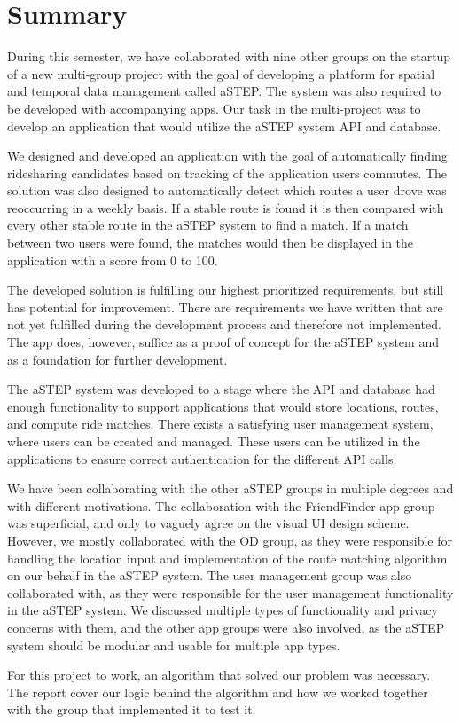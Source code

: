 \chapter*{Summary}
During this semester, we have collaborated with nine other groups on the startup of a new multi-group project with the goal of developing a platform for spatial and temporal data management called aSTEP. The system was also required to be developed with accompanying apps. Our task in the multi-project was to develop an application that would utilize the aSTEP system API and database.

We designed and developed an application with the goal of automatically finding ridesharing candidates based on tracking of the application users commutes. The solution was also designed to automatically detect which routes a user drove was reoccurring in a weekly basis. If a stable route is found it is then compared with every other stable route in the aSTEP system to find a match. If a match between two users were found, the matches would then be displayed in the application with a score from 0 to 100.

The developed solution is fulfilling our highest prioritized requirements, but still has potential for improvement. There are requirements we have written that are not yet fulfilled during the development process and therefore not implemented. The app does, however, suffice as a proof of concept for the aSTEP system and as a foundation for further development. 

The aSTEP system was developed to a stage where the API and database had enough functionality to support applications that would store locations, routes, and compute ride matches. There exists a satisfying user management system, where users can be created and managed. These users can be utilized in the applications to ensure correct authentication for the different API calls.

We have been collaborating with the other aSTEP groups in multiple degrees and with different motivations. The collaboration with the FriendFinder app group was superficial, and only to vaguely agree on the visual UI design scheme. 
However, we mostly collaborated with the OD group, as they were responsible for handling the location input and implementation of the route matching algorithm on our behalf in the aSTEP system. 
The user management group was also collaborated with, as they were responsible for the user management functionality in the aSTEP system. We discussed multiple types of functionality and privacy concerns with them, and the other app groups were also involved, as the aSTEP system should be modular and usable for multiple app types.

For this project to work, an algorithm that solved our problem was necessary. The report cover our logic behind the algorithm and how we worked together with the group that implemented it to test it.
